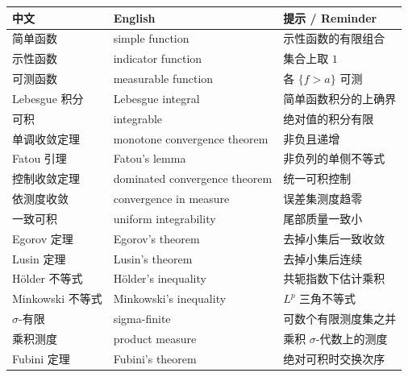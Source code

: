 \documentclass[UTF8,11pt,a4paper]{ctexart}
\begin{document}
\begin{center}\small
\renewcommand{\arraystretch}{1.08}
\begin{tabular}{@{}p{4.4cm}p{6.5cm}p{4.9cm}@{}}
\hline
中文 & English & 提示 / Reminder\\
\hline
简单函数 & simple function & 示性函数的有限组合\\
示性函数 & indicator function & 集合上取 $1$\\
可测函数 & measurable function & 各 $\{f>a\}$ 可测\\
Lebesgue 积分 & Lebesgue integral & 简单函数积分的上确界\\
可积 & integrable & 绝对值的积分有限\\
单调收敛定理 & monotone convergence theorem & 非负且递增\\
Fatou 引理 & Fatou's lemma & 非负列的单侧不等式\\
控制收敛定理 & dominated convergence theorem & 统一可积控制\\
依测度收敛 & convergence in measure & 误差集测度趋零\\
一致可积 & uniform integrability & 尾部质量一致小\\
Egorov 定理 & Egorov's theorem & 去掉小集后一致收敛\\
Lusin 定理 & Lusin's theorem & 去掉小集后连续\\
H\"older 不等式 & H\"older's inequality & 共轭指数下估计乘积\\
Minkowski 不等式 & Minkowski's inequality & $L^p$ 三角不等式\\
$\sigma$-有限 & sigma-finite & 可数个有限测度集之并\\
乘积测度 & product measure & 乘积 $\sigma$-代数上的测度\\
Fubini 定理 & Fubini's theorem & 绝对可积时交换次序\\
\hline
\end{tabular}
\end{center}
\end{document}
